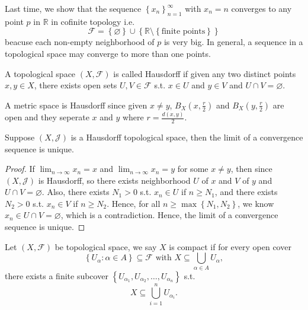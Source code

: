 Last time, we show that the sequence \(\left\{ x_n \right\}_{n=1}^{\infty}  \) with \(x_n = n\) converges to any point \(p\) in \(\mathbb{R} \) in cofinite topology i.e. 
\[
    \mathcal{F} = \left\{ \varnothing  \right\} \cup \left\{ \mathbb{R} \setminus \left\{ \text{finite points} \right\}  \right\}
\] beacuse each non-empty neighborhood of \(p\) is very big.  
In general, a sequence in a topological space may converge to more than one points. 
\begin{definition}[Hausdorff] \label{def: Hausdorff}
    A topological space \((X, \mathcal{F} )\)  is called Hausdorff if given any two distinct points \(x, y \in X\), there exists open sets \(U, V \in \mathcal{F} \) s.t. \(x \in U\) and \(y \in V\) and \(U \cap V = \varnothing \).     
\end{definition}

\begin{eg}
    A metric space is Hausdorff since given \(x \neq y\), \(B_X \left( x, \frac{r}{2} \right) \) and \(B_X \left( y, \frac{r}{2} \right) \) are open and they seperate \(x\) and \(y\) where \(r = \frac{d(x,y) }{2}\).     
\end{eg}

\begin{theorem} \label{thm: Hausdorff implies converge to exactly one point}
    Suppose \((X, \mathcal{J} )\) is a Hausdorff topological space, then the limit of a convergence sequence is unique.  
\end{theorem}
\begin{proof}
    If \(\lim_{n \to \infty} x_n = x\) and \(\lim_{n \to \infty} x_n = y \) for some \(x \neq y\), then since \((X, \mathcal{J} )\) is Hausdorff, so there exists neighborhood \(U\) of \(x\) and \(V\) of \(y\) and \(U \cap V = \varnothing \). Also, there exists \(N_1 > 0\) s.t. \(x_n \in U\) if \(n \ge N_1\), and there exists \(N_2 > 0\) s.t. \(x_n \in V\) if \(n \ge N_2\). Hence, for all \(n \ge \max \left\{ N_1, N_2 \right\} \), we know \(x_n \in U \cap V = \varnothing \), which is a contradiction. Hence, the limit of a convergence sequence is unique.                 
\end{proof}

\begin{definition}[Compact] \label{def: compact in topological space}
    Let \((X, \mathcal{F} )\) be topological space, we say \(X\) is compact if for every open cover 
    \[
        \left\{ U_\alpha  : \alpha \in A \right\} \subseteq \mathcal{F} \text{ with } X \subseteq \bigcup_{\alpha \in A} U_\alpha,  
    \] there exists a finite subcover \(\left\{ U_{\alpha _1}, U_{\alpha _2}, \dots , U_{\alpha _n} \right\} \) s.t. 
    \[
        X \subseteq \bigcup_{i=1}^n U_{\alpha _i}.  
    \] 
\end{definition}

